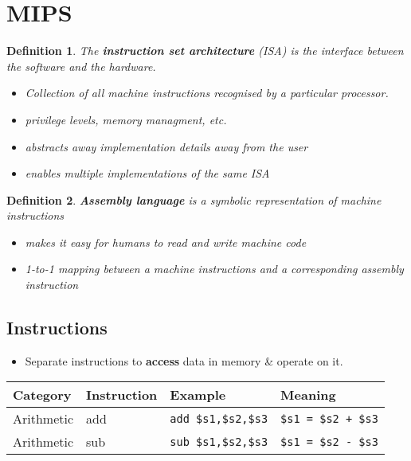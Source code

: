 \documentclass{article}
\theoremstyle{sltheorem}
\newtheorem{definition}{Definition}[section]
\newcommand*\B[1]{\textbf{#1}}
\newcommand*\T[1]{\texttt{#1}}
\begin{document}
\section{MIPS}
\begin{definition}
	The \B{instruction set architecture} (ISA) is the interface between
	the software and the hardware.
	\begin{itemize}
		\item Collection of all machine instructions recognised by
					a particular processor.
		\item privilege levels, memory managment, etc.
		\item abstracts away implementation details away from the user
		\item enables multiple implementations of the same ISA
	\end{itemize}
\end{definition}
\begin{definition}
	\B{Assembly language} is a symbolic representation of machine instructions
	\begin{itemize}
		\item makes it easy for humans to read and write machine code
		\item 1-to-1 mapping between a machine instructions and a corresponding
			    assembly instruction
	\end{itemize}
\end{definition}
\subsection{Instructions}
\begin{itemize}
	\item Separate instructions to \B{access} data in memory \& operate on it.
\end{itemize}

\begin{tabular}{| l | l | l | l |}
	\hline
	Category & Instruction & Example & Meaning	\\
	\hline
	\hline
	Arithmetic & add & \T{add \$s1,\$s2,\$s3} & \T{\$s1 = \$s2 + \$s3} \\
	\hline
	Arithmetic & sub & \T{sub \$s1,\$s2,\$s3} & \T{\$s1 = \$s2 - \$s3} \\
	\hline
\end{tabular}
\end{document}
